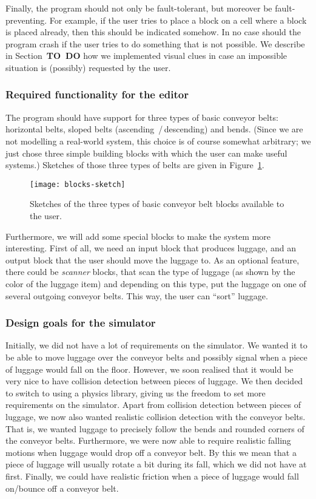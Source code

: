 Finally, the program should not only be fault-tolerant, but moreover be fault-preventing. For example, if the user tries to place a block on a cell where a block is placed already, then this should be indicated somehow. In no case should the program crash if the user tries to do something that is not possible. We describe in Section~\textbf{TO~DO} how we implemented visual clues in case an impossible situation is (possibly) requested by the user.

\subsubsection{Required functionality for the editor}
\label{subsubsec:req-functionality-simulator}
The program should have support for three types of basic conveyor belts: horizontal belts, sloped belts (ascending \,/\,descending) and bends. (Since we are not modelling a real-world system, this choice is of course somewhat arbitrary; we just chose three simple building blocks with which the user can make useful systems.) Sketches of those three types of belts are given in Figure~\ref{fig:blocks-sketch}.
\begin{figure}
  \begin{center}
    \texttt{[image: blocks-sketch]}
    \caption{Sketches of the three types of basic conveyor belt blocks available to the user.}
    \label{fig:blocks-sketch}
  \end{center}
\end{figure}

Furthermore, we will add some special blocks to make the system more interesting. First of all, we need an input block that produces luggage, and an output block that the user should move the luggage to. As an optional feature, there could be \emph{scanner} blocks, that scan the type of luggage (as shown by the color of the luggage item) and depending on this type, put the luggage on one of several outgoing conveyor belts. This way, the user can ``sort'' luggage.

\subsubsection{Design goals for the simulator}
\label{subsubsec:design-goals-simulator}
Initially, we did not have a lot of requirements on the simulator. We wanted it to be able to move luggage over the conveyor belts and possibly signal when a piece of luggage would fall on the floor. However, we soon realised that it would be very nice to have collision detection between pieces of luggage. We then decided to switch to using a physics library, giving us the freedom to set more requirements on the simulator. Apart from collision detection between pieces of luggage, we now also wanted realistic collision detection with the conveyor belts. That is, we wanted luggage to precisely follow the bends and rounded corners of the conveyor belts. Furthermore, we were now able to require realistic falling motions when luggage would drop off a conveyor belt. By this we mean that a piece of luggage will usually rotate a bit during its fall, which we did not have at first. Finally, we could have realistic friction when a piece of luggage would fall on/bounce off a conveyor belt.

